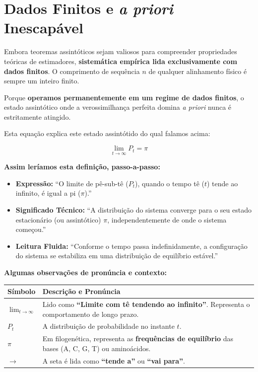 \section{Dados Finitos e \textit{a priori} Inescapável}

Embora teoremas assintóticos sejam valiosos para compreender propriedades teóricas de estimadores, \textbf{sistemática empírica lida exclusivamente com dados finitos}. O comprimento de sequência $n$ de qualquer alinhamento físico é sempre um inteiro finito.

Porque \textbf{operamos permanentemente em um regime de dados finitos}, o estado assintótico onde a verossimilhança perfeita domina \textit{a priori} nunca é estritamente atingido.

Esta equação explica este estado assintótido do qual falamos acima:

\begin{equation*}
    \lim_{t \to \infty} P_t = \pi
\end{equation*}

\textbf{Assim leríamos esta definição, passo-a-passo:}

\begin{itemize}
    \item \textbf{Expressão:} ``O limite de pê-sub-tê ($P_t$), quando o tempo tê ($t$) tende ao infinito, é igual a pi ($\pi$).''
    \item \textbf{Significado Técnico:} ``A distribuição do sistema converge para o seu estado estacionário (ou assintótico) $\pi$, independentemente de onde o sistema começou.''
    \item \textbf{Leitura Fluida:} ``Conforme o tempo passa indefinidamente, a configuração do sistema se estabiliza em uma distribuição de equilíbrio estável.''
\end{itemize}

\vspace{0.5cm}

\textbf{Algumas observações de pronúncia e contexto:}

\begin{center}
\renewcommand{\arraystretch}{1.5}
\begin{tabular}{lp{10cm}}
\hline
\textbf{Símbolo} & \textbf{Descrição e Pronúncia} \\ \hline
$\lim_{t \to \infty}$ & Lido como \textbf{``Limite com tê tendendo ao infinito''}. Representa o comportamento de longo prazo. \\
$P_t$ & A distribuição de probabilidade no instante $t$. \\
$\pi$ & Em filogenética, representa as \textbf{frequências de equilíbrio} das bases (A, C, G, T) ou aminoácidos. \\
$\to$ & A seta é lida como \textbf{``tende a''} ou \textbf{``vai para''}. \\ \hline
\end{tabular}
\end{center}


